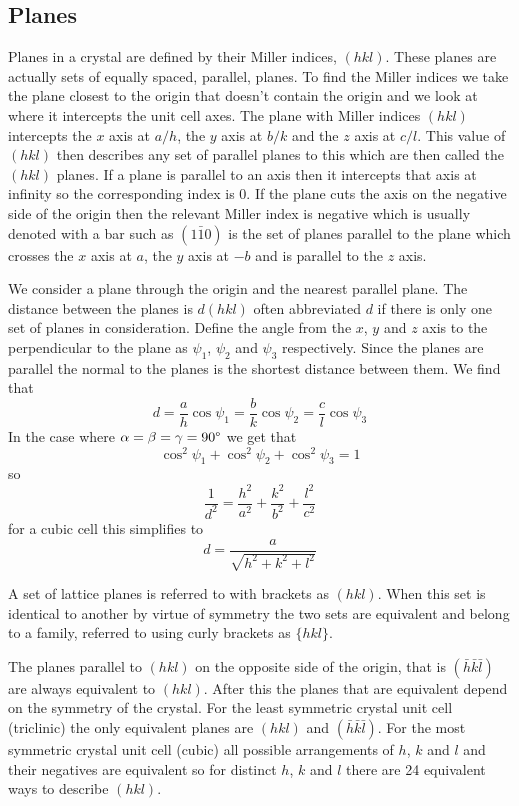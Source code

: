     \subsection{Planes}
    Planes in a crystal are defined by their Miller indices, \((hkl)\).
    These planes are actually sets of equally spaced, parallel, planes.
    To find the Miller indices we take the plane closest to the origin that doesn't contain the origin and we look at where it intercepts the unit cell axes.
    The plane with Miller indices \((hkl)\) intercepts the \(x\) axis at \(a/h\), the \(y\) axis at \(b/k\) and the \(z\) axis at \(c/l\).
    This value of \((hkl)\) then describes any set of parallel planes to this which are then called the \((hkl)\) planes.
    If a plane is parallel to an axis then it intercepts that axis at infinity so the corresponding index is 0.
    If the plane cuts the axis on the negative side of the origin then the relevant Miller index is negative which is usually denoted with a bar such as \((1\bar 1 0)\) is the set of planes parallel to the plane which crosses the \(x\) axis at \(a\), the \(y\) axis at \(-b\) and is parallel to the \(z\) axis.
    
    We consider a plane through the origin and the nearest parallel plane.
    The distance between the planes is \(d(hkl)\) often abbreviated \(d\)  if there is only one set of planes in consideration.
    Define the angle from the \(x\), \(y\) and \(z\) axis to the perpendicular to the plane as \(\psi_1\), \(\psi_2\) and \(\psi_3\) respectively.
    Since the planes are parallel the normal to the planes is the shortest distance between them.
    We find that
    \[d = \frac{a}{h}\cos\psi_1 = \frac{b}{k}\cos\psi_2 = \frac{c}{l}\cos\psi_3\]
    In the case where \(\alpha = \beta = \gamma = 90\SIUnitSymbolDegree\) we get that
    \[\cos^2\psi_1 + \cos^2\psi_2 + \cos^2\psi_3 = 1\]
    so
    \[\frac{1}{d^2} = \frac{h^2}{a^2} + \frac{k^2}{b^2} + \frac{l^2}{c^2}\]
    for a cubic cell this simplifies to
    \begin{equation}\label{eqn:d(hkl)}
        d = \frac{a}{\sqrt{h^2 + k^2 + l^2}}
    \end{equation}
    
    A set of lattice planes is referred to with brackets as \((hkl)\).
    When this set is identical to another by virtue of symmetry the two sets are equivalent and belong to a family, referred to using curly brackets as \(\{hkl\}\).
    
    The planes parallel to \((hkl)\) on the opposite side of the origin, that is \((\bar h\bar k\bar l)\) are always equivalent to \((hkl)\).
    After this the planes that are equivalent depend on the symmetry of the crystal.
    For the least symmetric crystal unit cell (triclinic) the only equivalent planes are \((hkl)\) and \((\bar h\bar k\bar l)\).
    For the most symmetric crystal unit cell (cubic) all possible arrangements of \(h\), \(k\) and \(l\) and their negatives are equivalent so for distinct \(h\), \(k\) and \(l\) there are 24 equivalent ways to describe \((hkl)\).
    
